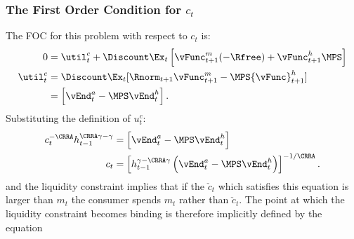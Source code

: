 \documentclass[titlepage]{\econtex}
\begin{document}
{  \subsubsection{The First Order Condition for ${c}_{t}$}
  The FOC for this problem with respect to ${c}_{t}$ is:
  \begin{equation}\begin{gathered}\begin{aligned}
    0  & = \util^{c}_{t} + \Discount \Ex_{t} \left[{\vFunc}^{m}_{t+1}(-\Rfree)+{\vFunc}^{h}_{t+1} \MPS\right]  \\
    \util^{c}_{t}  & = \Discount \Ex_{t} [\Rnorm_{t+1} {\vFunc}_{t+1}^{m}-\MPS {\vFunc}_{t+1}^{h}] \label{eq:ctfoc}
    \\            & = \left[\vEnd_{t}^{{a}}-\MPS \vEnd_{t}^{h} \right].
  \end{aligned}\end{gathered}\end{equation}
  Substituting the definition of $u_{t}^{c}$:
  \begin{equation}\begin{gathered}\begin{aligned}
    {c}_{t}^{-\CRRA}h_{t-1}^{\CRRA\gamma-\gamma}  & = \left[\vEnd_{t}^{{a}}-\MPS \vEnd_{t}^{h} \right]
    \\  {c}_{t}                                     & = \left[h_{t-1}^{\gamma-\CRRA\gamma} \left(\vEnd_{t}^{{a}}-\MPS \vEnd_{t}^{h} \right) \right]^{-1/\CRRA} \label{eq:habitsfoc}.
  \end{aligned}\end{gathered}\end{equation}
  and the liquidity constraint implies that if the $\check{c}_{t}$ which
  satisfies this equation is larger than ${m}_{t}$ the consumer spends
  ${m}_{t}$ rather than $\check{c}_{t}$.  The point at which the liquidity
  constraint becomes binding is therefore implicitly defined by the equation
  \begin{equation}\begin{gathered}\begin{aligned}

\end{aligned}
\end{gathered}
\end{equation}}
\end{document}
